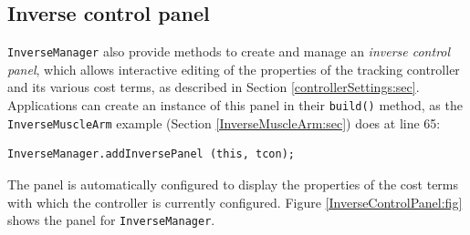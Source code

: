 \subsection{Inverse control panel}
\label{InverseControlPanel:sec}

{\tt InverseManager} also provide methods to create and manage an {\it inverse
control panel}, which allows interactive editing of the properties of the
tracking controller and its various cost terms, as described in Section
\ref{controllerSettings:sec}. Applications can create an instance of this 
panel in their {\tt build()} method, as the {\tt InverseMuscleArm} example
(Section \ref{InverseMuscleArm:sec}) does at line 65:
%
\begin{lstlisting}[]
      InverseManager.addInversePanel (this, tcon);
\end{lstlisting}
%
The panel is automatically configured to display the properties of the cost
terms with which the controller is currently configured. Figure
\ref{InverseControlPanel:fig} shows the panel for {\tt InverseManager}.

